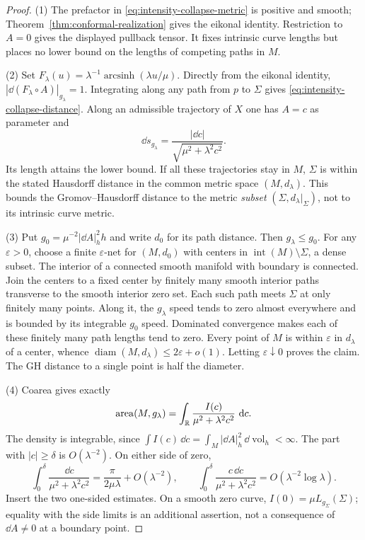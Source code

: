 \begin{proof}
(1) The prefactor in \eqref{eq:intensity-collapse-metric} is positive and smooth;
Theorem~\ref{thm:conformal-realization} gives the eikonal identity.  Restriction
to $A=0$ gives the displayed pullback tensor.  It fixes intrinsic curve lengths
but places no lower bound on the lengths of competing paths in $M$.

(2) Set $F_\lambda(u)=\lambda^{-1}\operatorname{arcsinh}(\lambda u/\mu)$.
Directly from the eikonal identity,
$|\dd(F_\lambda\circ A)|_{g_\lambda}=1$.  Integrating along any path from $p$
to $\Sigma$ gives \eqref{eq:intensity-collapse-distance}.  Along an admissible
trajectory of $X$ one has $A=c$ as parameter and
\[
 \dd s_{g_\lambda}=\frac{|\dd c|}{\sqrt{\mu^2+\lambda^2c^2}}.
\]
Its length attains the lower bound.  If all these trajectories stay in $M$,
$\Sigma$ is within the stated Hausdorff distance in the common metric space
$(M,d_\lambda)$.  This bounds the Gromov--Hausdorff distance to the metric
\emph{subset} $(\Sigma,d_\lambda|_\Sigma)$, not to its intrinsic curve metric.

(3) Put $g_0=\mu^{-2}|\dd A|_h^2h$ and write $d_0$ for its path distance.
Then $g_\lambda\le g_0$.  For any $\varepsilon>0$, choose a finite
$\varepsilon$-net for $(M,d_0)$ with centers in
$\operatorname{int}(M)\setminus\Sigma$, a dense subset.  The interior of a
connected smooth manifold with boundary is connected.  Join the centers to a
fixed center by finitely many smooth interior paths transverse to the
smooth interior zero set.  Each such path meets $\Sigma$ at only finitely many
points.  Along it, the $g_\lambda$ speed tends to zero almost everywhere and
is bounded by its integrable $g_0$ speed.  Dominated convergence makes each of
these finitely many path lengths tend to zero.  Every point of $M$ is within
$\varepsilon$ in $d_\lambda$ of a center, whence
$\operatorname{diam}(M,d_\lambda)\le2\varepsilon+o(1)$.
Letting $\varepsilon\downarrow0$ proves the claim.  The GH distance to a
single point is half the diameter.

(4) Coarea gives exactly
\[
 \operatorname{area}(M,g_\lambda)
 =\int_{\mathbb{R}}\frac{I(c)}{\mu^2+\lambda^2c^2}\,\,\mathrm{d} c.
\]
The density is integrable, since
$\int I(c)\,\dd c=\int_M|\dd A|_h^2\,\dd\operatorname{vol}_h<\infty$.
The part with $|c|\ge\delta$ is $O(\lambda^{-2})$.  On either side of zero,
\[
 \int_0^\delta\frac{\dd c}{\mu^2+\lambda^2c^2}
   =\frac{\pi}{2\mu\lambda}+O(\lambda^{-2}),
 \qquad
 \int_0^\delta\frac{c\,\dd c}{\mu^2+\lambda^2c^2}
   =O(\lambda^{-2}\log\lambda).
\]
Insert the two one-sided estimates.  On a smooth zero curve,
$I(0)=\mu L_{g_\Sigma}(\Sigma)$; equality with the side limits is an
additional assertion, not a consequence of $\dd A\ne0$ at a boundary point.
\end{proof}

